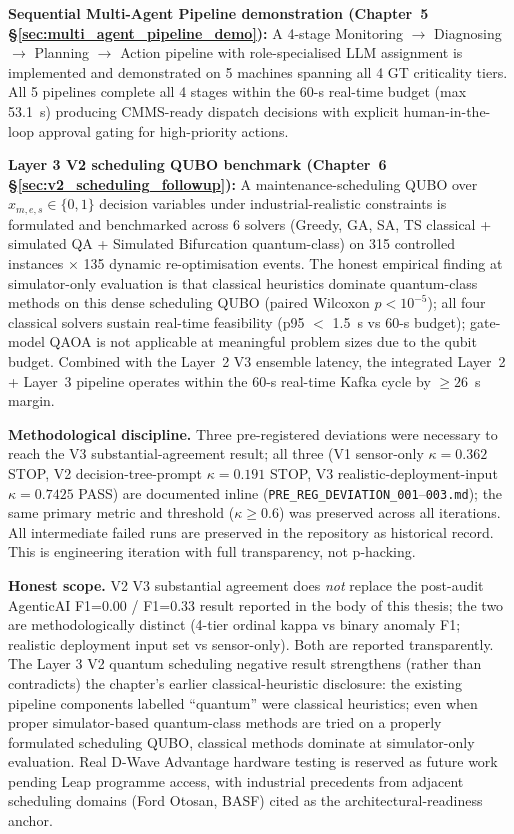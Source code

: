 \textbf{Sequential Multi-Agent Pipeline demonstration (Chapter~5 §\ref{sec:multi_agent_pipeline_demo}):} A 4-stage Monitoring $\to$ Diagnosing $\to$ Planning $\to$ Action pipeline with role-specialised LLM assignment is implemented and demonstrated on 5 machines spanning all 4 GT criticality tiers. All 5 pipelines complete all 4 stages within the 60-s real-time budget (max 53.1~s) producing CMMS-ready dispatch decisions with explicit human-in-the-loop approval gating for high-priority actions.

\textbf{Layer 3 V2 scheduling QUBO benchmark (Chapter~6 §\ref{sec:v2_scheduling_followup}):} A maintenance-scheduling QUBO over $x_{m,e,s} \in \{0,1\}$ decision variables under industrial-realistic constraints is formulated and benchmarked across 6 solvers (Greedy, GA, SA, TS classical + simulated QA + Simulated Bifurcation quantum-class) on 315 controlled instances $\times$ 135 dynamic re-optimisation events. The honest empirical finding at simulator-only evaluation is that classical heuristics dominate quantum-class methods on this dense scheduling QUBO (paired Wilcoxon $p < 10^{-5}$); all four classical solvers sustain real-time feasibility (p95 $<$ 1.5~s vs 60-s budget); gate-model QAOA is not applicable at meaningful problem sizes due to the qubit budget. Combined with the Layer~2 V3 ensemble latency, the integrated Layer~2 + Layer~3 pipeline operates within the 60-s real-time Kafka cycle by $\geq 26$~s margin.

\textbf{Methodological discipline.} Three pre-registered deviations were necessary to reach the V3 substantial-agreement result; all three (V1 sensor-only $\kappa = 0.362$ STOP, V2 decision-tree-prompt $\kappa = 0.191$ STOP, V3 realistic-deployment-input $\kappa = 0.7425$ PASS) are documented inline (\texttt{PRE\_REG\_DEVIATION\_001}--\texttt{003.md}); the same primary metric and threshold ($\kappa \geq 0.6$) was preserved across all iterations. All intermediate failed runs are preserved in the repository as historical record. This is engineering iteration with full transparency, not p-hacking.

\textbf{Honest scope.} V2 V3 substantial agreement does \emph{not} replace the post-audit AgenticAI F1=0.00 / F1=0.33 result reported in the body of this thesis; the two are methodologically distinct (4-tier ordinal kappa vs binary anomaly F1; realistic deployment input set vs sensor-only). Both are reported transparently. The Layer 3 V2 quantum scheduling negative result strengthens (rather than contradicts) the chapter's earlier classical-heuristic disclosure: the existing pipeline components labelled ``quantum'' were classical heuristics; even when proper simulator-based quantum-class methods are tried on a properly formulated scheduling QUBO, classical methods dominate at simulator-only evaluation. Real D-Wave Advantage hardware testing is reserved as future work pending Leap programme access, with industrial precedents from adjacent scheduling domains (Ford Otosan, BASF) cited as the architectural-readiness anchor.


